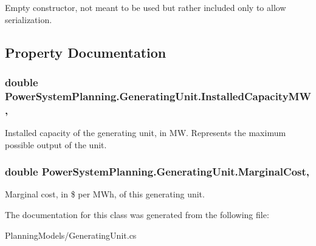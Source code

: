 Empty constructor, not meant to be used but rather included only to allow serialization. 



\subsection{Property Documentation}
\subsubsection[{\texorpdfstring{Installed\+Capacity\+MW}{InstalledCapacityMW}}]{\setlength{\rightskip}{0pt plus 5cm}double Power\+System\+Planning.\+Generating\+Unit.\+Installed\+Capacity\+MW\hspace{0.3cm}{\ttfamily [get]}, {\ttfamily [set]}}\hypertarget{class_power_system_planning_1_1_generating_unit_a85c9d9099840f3238ca341dd313b56f4}{}\label{class_power_system_planning_1_1_generating_unit_a85c9d9099840f3238ca341dd313b56f4}


Installed capacity of the generating unit, in MW. Represents the maximum possible output of the unit. 

\subsubsection[{\texorpdfstring{Marginal\+Cost}{MarginalCost}}]{\setlength{\rightskip}{0pt plus 5cm}double Power\+System\+Planning.\+Generating\+Unit.\+Marginal\+Cost\hspace{0.3cm}{\ttfamily [get]}, {\ttfamily [set]}}\hypertarget{class_power_system_planning_1_1_generating_unit_aec21179f99b2060e9c30ca59b0beab44}{}\label{class_power_system_planning_1_1_generating_unit_aec21179f99b2060e9c30ca59b0beab44}


Marginal cost, in \$ per M\+Wh, of this generating unit. 



The documentation for this class was generated from the following file\+:\begin{DoxyCompactItemize}
\item 
Planning\+Models/Generating\+Unit.\+cs\end{DoxyCompactItemize}
